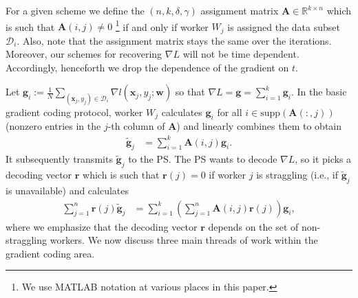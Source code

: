 \documentclass[journal,draftcls,onecolumn]{IEEEtran}
\theoremstyle{mystyle}
\newcommand{\calD}{\mathcal{D}}
\begin{document}


For a given scheme we define the $(n,k,\delta,\gamma)$ assignment matrix $\mathbf{A} \in \mathbb{R}^{k \times n}$ which is such that $\mathbf{A}(i,j) \ne 0$ \footnote{We use MATLAB notation at various places in this paper.} if and only if worker $W_j$ is assigned the data subset $\calD_i$. Also, note that the assignment matrix stays the same over the iterations. Moreover, our schemes for recovering $\nabla L$ will not be time dependent. Accordingly, henceforth we drop the dependence of the gradient on $t$. %

Let $\mathbf{g}_ i := \frac{1}{N} \sum_{(\mathbf{x}_j, y_j) \in \calD_i} \nabla l(\mathbf{x}_j, y_j; \mathbf{w})$ so that $\nabla L = \mathbf{g} = \sum_{i = 1}^k \mathbf{g}_i$. In the basic gradient coding protocol, worker $W_j$ calculates $\mathbf{g}_{i}$ for all $i \in \text{supp}(\mathbf{A}(:,j))$ (nonzero entries in the $j$-th column of $\mathbf{A}$) and linearly combines them to obtain %
 \begin{align}
     \tilde{\mathbf{g}}_j &= \sum_{i=1}^k \mathbf{A}(i,j) \mathbf{g}_{i}.\label{eq:linearly_comb_grad}
 \end{align}
It subsequently transmits $\tilde{\mathbf{g}}_j$ to the PS. %
The PS wants to decode $\nabla L$, so it picks a decoding vector $\mathbf{r}$ which is such that $\mathbf{r}(j) =0$ if worker $j$ is straggling (i.e., if $\tilde{\mathbf{g}}_j$ is unavailable) and calculates %
\begin{align}
\sum_{j=1}^n \mathbf{r}(j) \tilde{\mathbf{g}}_j &= \sum_{i=1}^k  \left( \sum_{j=1}^n   \mathbf{A}(i,j) \mathbf{r}(j) \right) {\mathbf{g}}_{i}, \label{eq:grad_cod_eq}
\end{align}
where we emphasize that the decoding vector $\mathbf{r}$ depends on the set of non-straggling workers. We now discuss three main threads of work within the gradient coding area.
\end{document}
